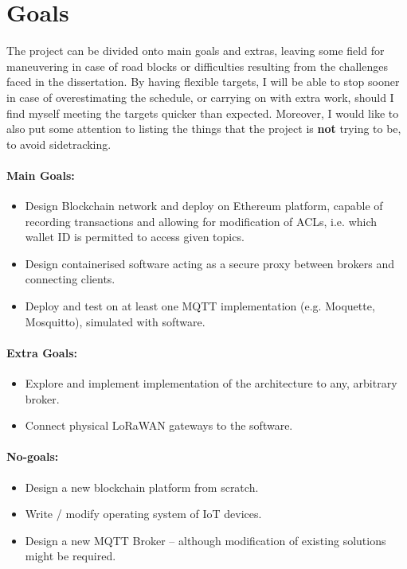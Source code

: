 \documentclass[a4paper,12pt]{article}
\begin{document}
\section*{Goals}

The project can be divided onto main goals and extras, leaving some field for maneuvering in case of road blocks or difficulties resulting from the challenges faced in the dissertation. By having flexible targets, I will be able to stop sooner in case of overestimating the schedule, or carrying on with extra work, should I find myself meeting the targets quicker than expected. Moreover, I would like to also put some attention to listing the things that the project is \textbf{not} trying to be, to avoid sidetracking.

\paragraph{Main Goals:}
\begin{itemize}
  \item Design Blockchain network and deploy on Ethereum platform, capable of recording transactions and allowing for modification of ACLs, i.e. which wallet ID is permitted to access given topics.
  \item Design containerised software acting as a secure proxy between brokers and connecting clients.
  \item Deploy and test on at least one MQTT implementation (e.g. Moquette, Mosquitto), simulated with software.
\end{itemize}

\paragraph{Extra Goals:}
\begin{itemize}
  \item Explore and implement implementation of the architecture to any, arbitrary broker.
  \item Connect physical LoRaWAN gateways to the software.
\end{itemize}

\paragraph{No-goals:}
\begin{itemize}
  \item Design a new blockchain platform from scratch.
  \item Write / modify operating system of IoT devices.
  \item Design a new MQTT Broker -- although modification of existing solutions might be required.
\end{itemize}
\end{document}

